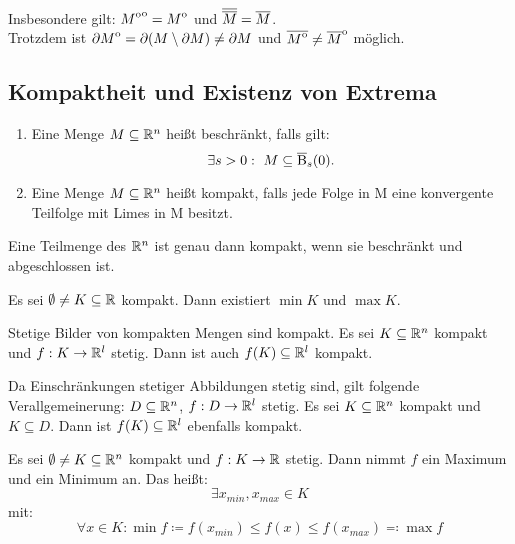 \begin{bem}
    Insbesondere gilt: ${\kern0pt{\kern0ptM}^{\mathrm{o}}}^{\mathrm{o}} = {\kern0ptM}^{\mathrm{o}}$ und ${\overline{\kern0pt{\overline{\kern0ptM}}}}={\overline{\kern0ptM}}$.\\
    Trotzdem ist $\partial{\kern0ptM}^{\mathrm{o}} = \partial(M\setminus\partial M) \neq \partial M$ und ${\overline{\kern0pt{\kern0ptM}^{\mathrm{o}}}} \neq {\kern0pt {\overline{\kern0ptM}}}^{\mathrm{o}}$ möglich.
\end{bem}

\subsection{Kompaktheit und Existenz von Extrema}
\begin{defn}
    \begin{enumerate}
        \item Eine Menge $M\subseteq\mathbb{R}^n$ heißt beschränkt, falls gilt:
        \[
            \exists s>0:\ M\subseteq\operatorname{\overline{B}}_s(0).
        \]
        \item Eine Menge $M\subseteq\mathbb{R}^n$ heißt kompakt, falls jede Folge in M eine konvergente Teilfolge mit Limes in M besitzt.
    \end{enumerate}
\end{defn}
\begin{satz}
    Eine Teilmenge des $\mathbb{R}^n$ ist genau dann kompakt, wenn sie beschränkt und abgeschlossen ist.
\end{satz}
\begin{satz}
    Es sei $\emptyset\neq K\subseteq \mathbb{R}$ kompakt. Dann existiert $\min K$ und $\max K$.
\end{satz}
\begin{satz}
    Stetige Bilder von kompakten Mengen sind kompakt. Es sei $K\subseteq \mathbb{R}^n$ kompakt und $f:K\to\mathbb{R}^l$ stetig. Dann ist auch $f(K)\subseteq\mathbb{R}^l$ kompakt.
\end{satz}
\begin{bem}
    Da Einschränkungen stetiger Abbildungen stetig sind, gilt folgende Verallgemeinerung: $D\subseteq\mathbb{R}^n$, $f:D\to\mathbb{R}^l$ stetig. Es sei $K\subseteq \mathbb{R}^n$ kompakt und $K\subseteq D$.
    Dann ist $f(K)\subseteq \mathbb{R}^l$ ebenfalls kompakt.
\end{bem}
\begin{kor}
    Es sei $\emptyset\neq K \subseteq \mathbb{R}^n$ kompakt und $f:K\to\mathbb{R}$ stetig. Dann nimmt $f$ ein Maximum und ein Minimum an.
    Das heißt:
    \[
        \exists x_{min}, x_{max}\in K
    \]
    mit:
    \[
        \forall x\in K: \min{f} \coloneqq f(x_{min})\leq f(x)\leq f(x_{max}) \eqqcolon \max{f}
    \]
\end{kor}
